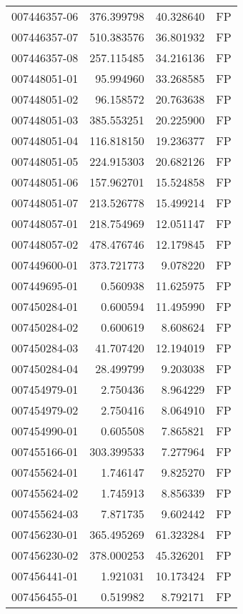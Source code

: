 \begin{tabular}{lrrl}
007446357-06 &  376.399798 &    40.328640 &   FP \\
007446357-07 &  510.383576 &    36.801932 &   FP \\
007446357-08 &  257.115485 &    34.216136 &   FP \\
007448051-01 &   95.994960 &    33.268585 &   FP \\
007448051-02 &   96.158572 &    20.763638 &   FP \\
007448051-03 &  385.553251 &    20.225900 &   FP \\
007448051-04 &  116.818150 &    19.236377 &   FP \\
007448051-05 &  224.915303 &    20.682126 &   FP \\
007448051-06 &  157.962701 &    15.524858 &   FP \\
007448051-07 &  213.526778 &    15.499214 &   FP \\
007448057-01 &  218.754969 &    12.051147 &   FP \\
007448057-02 &  478.476746 &    12.179845 &   FP \\
007449600-01 &  373.721773 &     9.078220 &   FP \\
007449695-01 &    0.560938 &    11.625975 &   FP \\
007450284-01 &    0.600594 &    11.495990 &   FP \\
007450284-02 &    0.600619 &     8.608624 &   FP \\
007450284-03 &   41.707420 &    12.194019 &   FP \\
007450284-04 &   28.499799 &     9.203038 &   FP \\
007454979-01 &    2.750436 &     8.964229 &   FP \\
007454979-02 &    2.750416 &     8.064910 &   FP \\
007454990-01 &    0.605508 &     7.865821 &   FP \\
007455166-01 &  303.399533 &     7.277964 &   FP \\
007455624-01 &    1.746147 &     9.825270 &   FP \\
007455624-02 &    1.745913 &     8.856339 &   FP \\
007455624-03 &    7.871735 &     9.602442 &   FP \\
007456230-01 &  365.495269 &    61.323284 &   FP \\
007456230-02 &  378.000253 &    45.326201 &   FP \\
007456441-01 &    1.921031 &    10.173424 &   FP \\
007456455-01 &    0.519982 &     8.792171 &   FP \\

\end{tabular}
